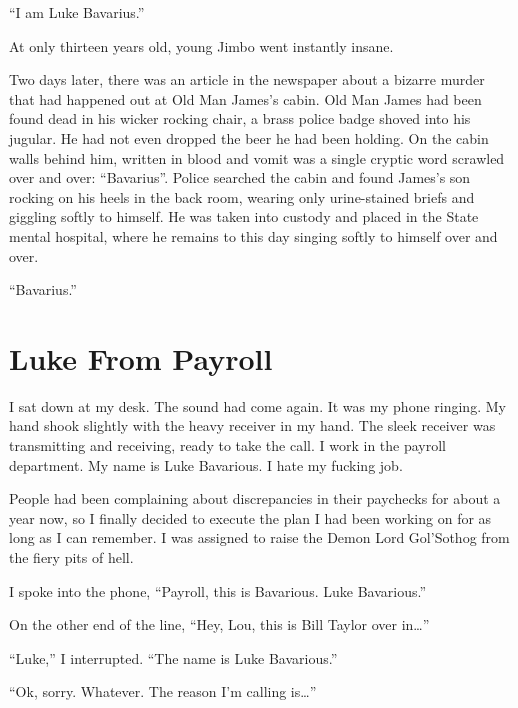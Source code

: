 ``I am Luke Bavarius.''

At only thirteen years old, young Jimbo went instantly
insane.



Two days later, there was an article in the newspaper about a
bizarre murder that had happened out at Old Man James's
cabin. Old Man James had been found dead in his wicker rocking
chair, a brass police badge shoved into his jugular. He had not
even dropped the beer he had been holding. On the cabin walls
behind him, written in blood and vomit was a single cryptic word
scrawled over and over: ``Bavarius''. Police searched the
cabin and found James's son rocking on his heels in the back
room, wearing only urine-stained briefs and giggling softly to
himself. He was taken into custody and placed in the State mental
hospital, where he remains to this day singing softly to himself
over and over.

``Bavarius.'' 
 



\chapter{Luke From Payroll}


I sat down at my desk. The sound had come again. It was my phone
ringing. My hand shook slightly with the heavy receiver in my hand.
The sleek receiver was transmitting and receiving, ready to take
the call. I work in the payroll department. My name is Luke
Bavarious. I hate my fucking job.



People had been complaining about discrepancies in their paychecks
for about a year now, so I finally decided to execute the plan I
had been working on for as long as I can remember. I was assigned
to raise the Demon Lord Gol'Sothog from the fiery pits of
hell.



I spoke into the phone, ``Payroll, this is Bavarious. Luke
Bavarious.''



On the other end of the line, ``Hey, Lou, this is Bill Taylor over
in{\ldots}''



``Luke,'' I interrupted. ``The name is Luke Bavarious.''



``Ok, sorry. Whatever. The reason I'm calling is{\ldots}''



